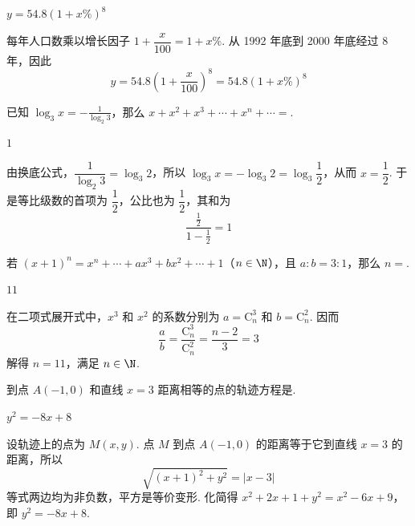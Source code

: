 \documentclass[UTF8,a4paper,oneside,11pt]{ctexbook}
\begin{document}
\begin{answer}
\(y=54.8\left(1+x\%\right)^8\)
\end{answer}

\begin{solution}
每年人口数乘以增长因子 \(1+\dfrac{x}{100}=1+x\%\). 从 1992 年底到 2000 年底经过 \(8\) 年，因此
\[
y=54.8\left(1+\frac{x}{100}\right)^8=54.8\left(1+x\%\right)^8
\]
\end{solution}

\begin{problem}
已知 \(\log_3 x=-\frac{1}{\log_2 3}\)，那么 \(x+x^2+x^3+\cdots+x^n+\cdots=\)\fillinblank{}.
\end{problem}

\begin{answer}
\(1\)
\end{answer}

\begin{solution}
由换底公式，\(\dfrac{1}{\log_2 3}=\log_3 2\)，所以 \(\log_3x=-\log_3 2=\log_3\dfrac12\)，从而 \(x=\dfrac12\). 于是等比级数的首项为 \(\dfrac12\)，公比也为 \(\dfrac12\)，其和为
\[
\frac{\frac12}{1-\frac12}=1
\]
\end{solution}

\begin{problem}
若 \((x+1)^n=x^n+\cdots+ax^3+bx^2+\cdots+1\)（\(n\in\N\)），且 \(a:b=3:1\)，那么 \(n=\)\fillinblank{}.
\end{problem}

\begin{answer}
\(11\)
\end{answer}

\begin{solution}
在二项式展开式中，\(x^3\) 和 \(x^2\) 的系数分别为 \(a=\mathrm C_n^3\) 和 \(b=\mathrm C_n^2\). 因而
\[
\frac{a}{b}=\frac{\mathrm C_n^3}{\mathrm C_n^2}=\frac{n-2}{3}=3
\]
解得 \(n=11\)，满足 \(n\in\N\).
\end{solution}

\begin{problem}
到点 \(A(-1,0)\) 和直线 \(x = 3\) 距离相等的点的轨迹方程是\fillinblank{}.
\end{problem}

\begin{answer}
\(y^2=-8x+8\)
\end{answer}

\begin{solution}
设轨迹上的点为 \(M(x,y)\). 点 \(M\) 到点 \(A(-1,0)\) 的距离等于它到直线 \(x=3\) 的距离，所以
\[
\sqrt{(x+1)^2+y^2}=|x-3|
\]
等式两边均为非负数，平方是等价变形. 化简得 \(x^2+2x+1+y^2=x^2-6x+9\)，即 \(y^2=-8x+8\).
\end{solution}
\end{document}
